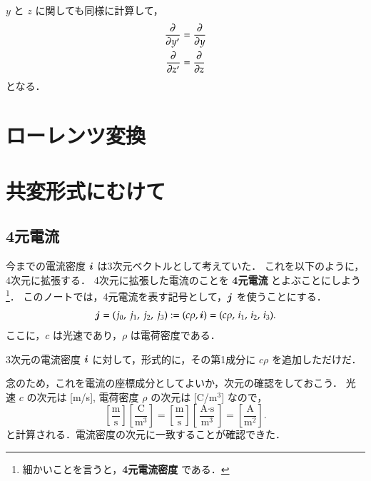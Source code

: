                 $y$ と $z$ に関しても同様に計算して，
                        \begin{align}
                            \frac{\partial   }{\partial y'} &=  \frac{\partial   }{\partial y } \\
                            \frac{\partial   }{\partial z'} &=  \frac{\partial   }{\partial z }
                        \end{align}
                となる．



    \section{ローレンツ変換}

    \section{共変形式にむけて}
        \subsection{4元電流}
            今までの電流密度 $\boldsymbol{i}$ は3次元ベクトルとして考えていた．
            これを以下のように，4次元に拡張する．
            4次元に拡張した電流のことを \textbf{4元電流} とよぶことにしよう
                \footnote{
                    細かいことを言うと，\textbf{4元電流密度} である．
                }．
            このノートでは，4元電流を表す記号として，$\boldsymbol{j}$ を使うことにする．
                \begin{align}
                    \boldsymbol{j} = ({j}_{0},\,{j}_{1},\,{j}_{2},\,{j}_{3}) := (c\rho, \boldsymbol{i}) = (c\rho,\,{i}_{1},\,{i}_{2},\,{i}_{3}).
                \end{align}
            ここに，$c$ は光速であり，$\rho$ は電荷密度である．

            3次元の電流密度 $\boldsymbol{i}$ に対して，形式的に，その第1成分に $c\rho$ を追加しただけだ．

            念のため，これを電流の座標成分としてよいか，次元の確認をしておこう．
            光速 $c$ の次元は [m/s], 電荷密度 $\rho$ の次元は [C/$\mbox{m}^{3}$] なので，
                \begin{equation*}
                    \left[\frac{\mbox{m}}{\mbox{s}} \right]
                    \left[\frac{\mbox{C}}{\mbox{m}^{3}}\right]
                    =
                    \left[\frac{\mbox{m}}{\mbox{s}} \right]
                    \left[\frac{\mbox{A} \cdot \mbox{s}}{\mbox{m}^{3}}\right]
                    =
                    \left[\frac{\mbox{A}}{\mbox{m}^{2}} \right].
                \end{equation*}
            と計算される．電流密度の次元に一致することが確認できた．



